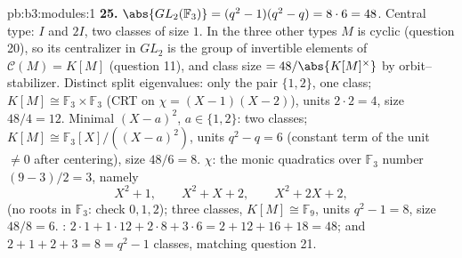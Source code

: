 \begin{solution}{pb:b3:modules:1}
\textbf{25.} $\abs{GL_2(\mathbb F_3)} = (q^2 - 1)(q^2 - q) =
8 \cdot 6 = 48$. Central type: $I$ and $2I$, two classes of
size $1$. In the three other types $M$ is cyclic (question
20), so its centralizer in $GL_2$ is the group of invertible
elements of $\mathcal C(M) = K[M]$ (question 11), and class
size $=48/\abs{K[M]^\times}$ by orbit--stabilizer. Distinct
split eigenvalues: only the pair $\{1, 2\}$, one class; $K[M]
\cong \mathbb F_3 \times \mathbb F_3$ (CRT on $\chi = (X-1)
(X-2)$), units $2 \cdot 2 = 4$, size $48/4 = 12$. Minimal
$(X - a)^2$, $a \in \{1, 2\}$: two classes; $K[M] \cong
\mathbb F_3[X]/((X-a)^2)$, units $q^2 - q = 6$ (constant term
of the unit $\neq 0$ after centering), size $48/6 = 8$.
 $\chi$: the monic  quadratics over
$\mathbb F_3$ number $(9 - 3)/2 = 3$, namely
\[
X^2 + 1, \qquad X^2 + X + 2, \qquad X^2 + 2X + 2,
\]
(no roots in $\mathbb F_3$: check $0, 1, 2$); three classes,
$K[M] \cong \mathbb F_9$, units $q^2 - 1 = 8$, size $48/8 =
6$. : $2\cdot1 + 1\cdot12 + 2\cdot8 + 3\cdot6 =
2 + 12 + 16 + 18 = 48$; and $2 + 1 + 2 + 3 = 8 = q^2 - 1$
classes, matching question 21.
\end{solution}
